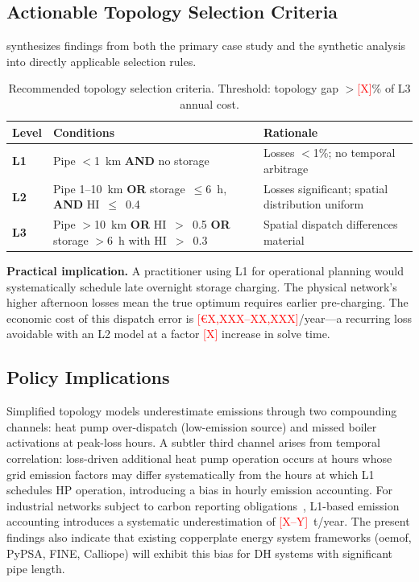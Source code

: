 \documentclass[review,3p]{elsarticle}
\newcommand{\placeholder}[1]{\textcolor{red}{[#1]}}
\begin{document}
\subsection{Actionable Topology Selection Criteria}
\label{sec:disc_criteria}

 synthesizes findings from both the primary case
study and the synthetic analysis into directly applicable selection
rules.

\begin{table}[htbp]
\centering
\caption{Recommended topology selection criteria. Threshold:
topology gap $>$\placeholder{X}\% of L3 annual cost.}
\label{tab:criteria}
\begin{tabular}{@{}p{1.3cm}p{5.5cm}p{4.5cm}@{}}
\toprule
Level & Conditions & Rationale \\
\midrule
\textbf{L1}
  & Pipe $<$1~km \textbf{AND} no storage
  & Losses $<$1\%; no temporal arbitrage \\[4pt]
\textbf{L2}
  & Pipe 1--10~km \textbf{OR} storage~$\leq$6~h, \textbf{AND}
  HI~$\leq$~0.4
  & Losses significant; spatial distribution uniform \\[4pt]
\textbf{L3}
  & Pipe $>$10~km \textbf{OR} HI~$>$~0.5 \textbf{OR}
  storage $>$6~h with HI~$>$~0.3
  & Spatial dispatch differences material \\
\bottomrule
\end{tabular}
\end{table}

\textbf{Practical implication.} A practitioner using L1 for
operational planning would systematically schedule late overnight
storage charging. The physical network's higher afternoon losses
mean the true optimum requires earlier pre-charging. The economic
cost of this dispatch error is \placeholder{€X,XXX--XX,XXX}/year---a
recurring loss avoidable with an L2 model at a factor
\placeholder{X} increase in solve time.

\subsection{ Policy Implications}
\label{sec:disc_co2}

Simplified topology models underestimate  emissions through
two compounding channels: heat pump over-dispatch (low-emission source)
and missed boiler activations at peak-loss hours. A subtler third channel arises from temporal correlation:
loss-driven additional heat pump operation occurs at hours
whose grid emission factors may differ systematically from
the hours at which L1 schedules HP operation, introducing
a bias in hourly emission accounting. For industrial
networks subject to carbon reporting
obligations~\cite{EUheating2016}, L1-based emission accounting
introduces a systematic underestimation of
\placeholder{X--Y}~t/year. The present findings also
indicate that existing copperplate energy system frameworks (oemof,
PyPSA, FINE, Calliope) will exhibit this bias for DH systems with
significant pipe length.
\end{document}
